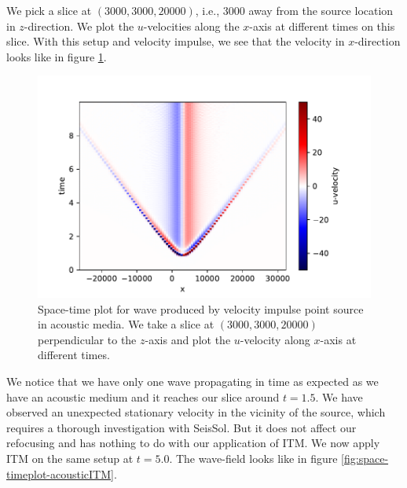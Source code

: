 We pick a slice at $\left(3000,3000,20000\right)$, i.e., 3000 away from the source location in $z$-direction.
We plot the $u$-velocities along the $x$-axis at different times on this slice. With this setup and velocity impulse, we see that the velocity in $x$-direction
looks like in figure \ref{fig:space-timeplot-acousticnoITM}.
\begin{figure}[htpb]
    \centering
    \includegraphics[width=0.9\linewidth]{figures/Acoustic-noITM.pdf}
    \caption{Space-time plot for wave produced by velocity impulse point source in acoustic media. We take a slice at $\left(3000,3000,20000\right)$ perpendicular to the $z$-axis 
    and plot the $u$-velocity along $x$-axis at different times.}
    \label{fig:space-timeplot-acousticnoITM}
\end{figure}

We notice that we have only one wave propagating in time as expected as we have an acoustic medium and it reaches our slice around $t=1.5$. 
We have observed an unexpected stationary velocity in the vicinity of the source, which requires a thorough investigation with SeisSol. But it does not affect our refocusing and has nothing to do with
our application of \ac{ITM}. We now apply ITM on the same setup at $t=5.0$. The wave-field looks like in figure \ref{fig:space-timeplot-acousticITM}.

